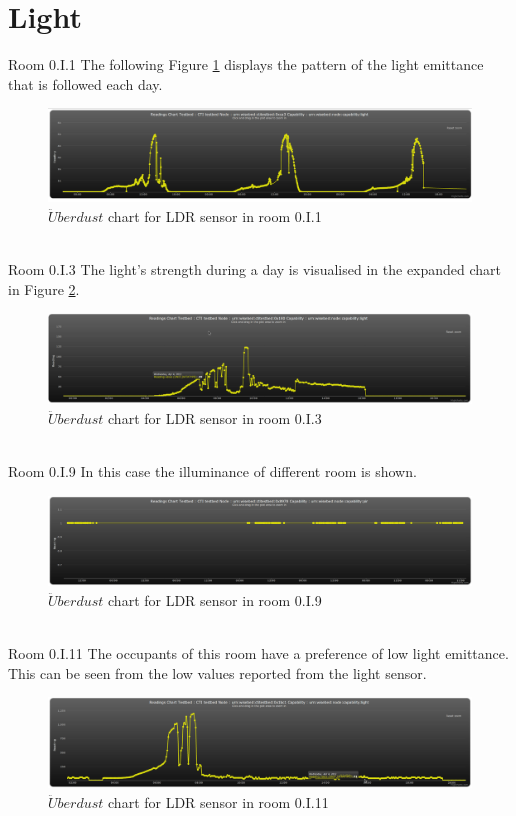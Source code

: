\documentclass[12pt,a4paper,draft]{report}
\begin{document}
\section{Light}
%
{Room 0.I.1}
%
The following Figure \ref{chart_light_1} displays the pattern of the light emittance that is followed each day.
\begin{figure}[H]
\centering
	\includegraphics*[scale=0.3]{light_1}
	\caption{$\ddot{U}berdust$ chart for LDR sensor in room 0.I.1}
	\label{chart_light_1}
\end{figure}
\ \\
%
{Room 0.I.3}
%
The light's strength during a day is visualised in the expanded chart in Figure \ref{chart_light_3}.
\begin{figure}[H]
\centering
	\includegraphics*[scale=0.3]{light_3}
	\caption{$\ddot{U}berdust$ chart for LDR sensor in room 0.I.3}
	\label{chart_light_3}
\end{figure}
\ \\
%
{Room 0.I.9}
%
In this case the illuminance of different room is shown.
\begin{figure}[H]
\centering
	\includegraphics*[scale=0.3]{pir_9}
	\caption{$\ddot{U}berdust$ chart for LDR sensor in room 0.I.9}
	\label{chart_light_9}
\end{figure}
\ \\
%
{Room 0.I.11}
%
The occupants of this room have a preference of low light emittance.
This can be seen from the low values reported from the light sensor.
\begin{figure}[H]
\centering
	\includegraphics*[scale=0.3]{light_11}
	\caption{$\ddot{U}berdust$ chart for LDR sensor in room 0.I.11}
	\label{chart_light_11}
\end{figure}
\ \\
%
\end{document}
